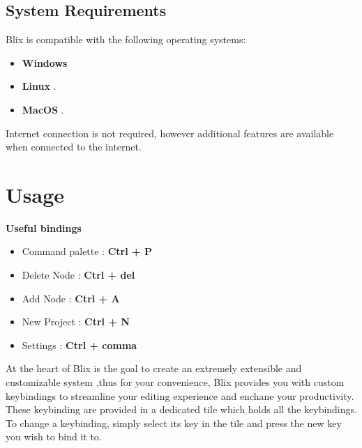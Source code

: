 \documentclass[11pt,a4paper]{article}
\begin{document}
\subsection*{System Requirements}

Blix is compatible with the following operating systems:
\begin{itemize}
  \item[\textbullet] \textbf{Windows}
  \item[\textbullet] \textbf{Linux }.
  \item[\textbullet] \textbf{MacOS }.
\end{itemize}

 Internet connection is not required, however additional features are available when connected to the internet.

\section*{Usage}

\textbf{Useful bindings}
\begin{itemize}
  \item[\textbullet] Command palette : \textbf{Ctrl + P}
  \item[\textbullet] Delete Node : \textbf{Ctrl + del}
  \item[\textbullet] Add Node : \textbf{Ctrl + A}
  \item[\textbullet] New Project : \textbf{Ctrl + N}
  \item[\textbullet] Settings : \textbf{Ctrl + comma}

\end{itemize}

At the heart of Blix is the goal to create an extremely extensible and customizable system ,thus for your convenience, Blix provides you with custom keybindings to streamline your editing experience and enchane your productivity.
These keybinding are provided in a dedicated tile which holds all the keybindings. To change a keybinding, simply select its key in the tile and press the new key you wish to bind it to.
\end{document}
